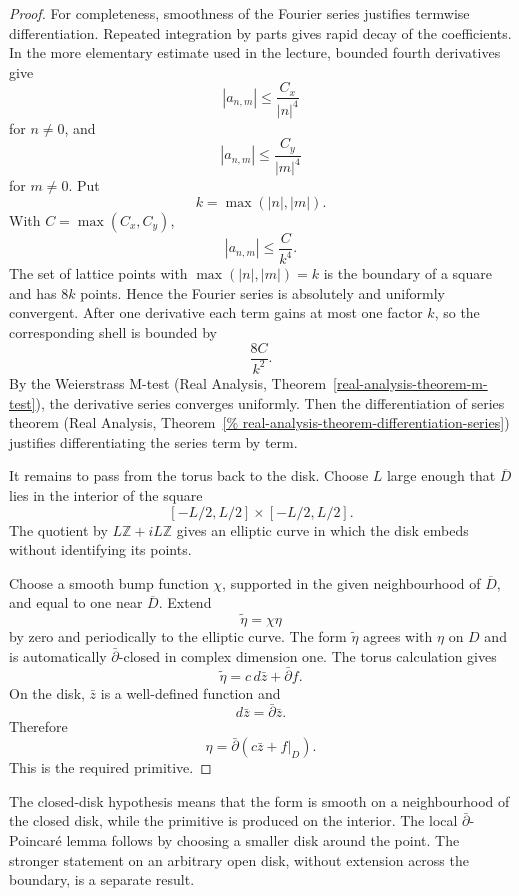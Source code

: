 \begin{proof}
For completeness, smoothness of the Fourier
series justifies termwise differentiation.
Repeated integration by parts gives rapid
decay of the coefficients. In the more
elementary estimate used in the lecture,
bounded fourth derivatives give
$$
|a_{n,m}|
\leq
\frac{C_x}{|n|^4}
$$
for $n\neq0$, and
$$
|a_{n,m}|
\leq
\frac{C_y}{|m|^4}
$$
for $m\neq0$. Put
$$
k=\max(|n|,|m|).
$$
With $C=\max(C_x,C_y)$,
$$
|a_{n,m}|
\leq
\frac{C}{k^4}.
$$
The set of lattice points with
$\max(|n|,|m|)=k$ is the boundary of a
square and has $8k$ points. Hence the
Fourier series is absolutely and uniformly
convergent. After one derivative each term
gains at most one factor $k$, so the
corresponding shell is bounded by
$$
\frac{8C}{k^2}.
$$
By the Weierstrass M-test
(Real Analysis,
Theorem~\ref{real-analysis-theorem-m-test}),
the derivative series converges uniformly.
Then the differentiation of series theorem
(Real Analysis,
Theorem~\ref{%
real-analysis-theorem-differentiation-series})
justifies differentiating the series term by
term.

It remains to pass from the torus back to
the disk. Choose $L$ large enough that
$\overline D$ lies in the interior of the
square
$$
[-L/2,L/2]\times[-L/2,L/2].
$$
The quotient by
$L\mathbb Z+iL\mathbb Z$ gives an elliptic
curve in which the disk embeds without
identifying its points.

Choose a smooth bump function $\chi$,
supported in the given neighbourhood of
$\overline D$, and equal to one near
$\overline D$. Extend
$$
\widetilde\eta=\chi\eta
$$
by zero and periodically to the elliptic
curve. The form $\widetilde\eta$ agrees with
$\eta$ on $D$ and is automatically
$\bar\partial$-closed in complex dimension
one. The torus calculation gives
$$
\widetilde\eta
=
c\,d\bar z+\bar\partial f.
$$
On the disk, $\bar z$ is a well-defined
function and
$$
d\bar z=\bar\partial\bar z.
$$
Therefore
$$
\eta
=
\bar\partial
\left(
c\bar z+f|_D
\right).
$$
This is the required primitive.
\end{proof}

\begin{remark}
\label{remark-dbar-poincare-boundary}
The closed-disk hypothesis means that the
form is smooth on a neighbourhood of the
closed disk, while the primitive is produced
on the interior. The local
$\bar\partial$-Poincaré lemma follows by
choosing a smaller disk around the point.
The stronger statement on an arbitrary open
disk, without extension across the boundary,
is a separate result.
\end{remark}

